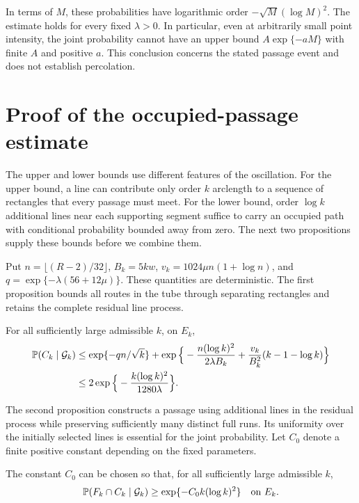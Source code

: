 \documentclass[11pt,letterpaper]{article}
\begin{document}
In terms of $M$, these probabilities have logarithmic order $-\sqrt M(\log M)^2$. The estimate holds for every fixed $\lambda>0$. In particular, even at arbitrarily small point intensity, the joint probability cannot have an upper bound $A\exp\{-aM\}$ with finite $A$ and positive $a$. This conclusion concerns the stated passage event and does not establish percolation.

\section{Proof of the occupied-passage estimate}

The upper and lower bounds use different features of the oscillation. For the upper bound, a line can contribute only order $k$ arclength to a sequence of rectangles that every passage must meet. For the lower bound, order $\log k$ additional lines near each supporting segment suffice to carry an occupied path with conditional probability bounded away from zero. The next two propositions supply these bounds before we combine them.

Put $n=\lfloor(R-2)/32\rfloor$, $B_k=5kw$, $v_k=1024\mu n(1+\log n)$, and $q=\exp\{-\lambda(56+12\mu)\}$. These quantities are deterministic. The first proposition bounds all routes in the tube through separating rectangles and retains the complete residual line process.

\begin{proposition}\label{prop:upper}
For all sufficiently large admissible $k$, on $E_k$,
\begin{equation}\label{eq:upper-explicit}
\begin{aligned}
 \P(C_k\mid\mathcal G_k)
 &\le \exp\{-qn/\sqrt k\}
 +\exp\Big\{-\frac{n(\log k)^2}{2\lambda B_k}
          +\frac{v_k}{B_k^2}(k-1-\log k)\Big\}\\
 &\le2\exp\Big\{-\frac{k(\log k)^2}{1280\lambda}\Big\}.
\end{aligned}
\end{equation}
\end{proposition}

The second proposition constructs a passage using additional lines in the residual process while preserving sufficiently many distinct full runs. Its uniformity over the initially selected lines is essential for the joint probability. Let $C_0$ denote a finite positive constant depending on the fixed parameters.

\begin{proposition}\label{prop:lower}
The constant $C_0$ can be chosen so that, for all sufficiently large admissible $k$,
\begin{equation}\label{eq:lower}
 \P(F_k\cap C_k\mid\mathcal G_k)\ge\exp\{-C_0k(\log k)^2\}
 \quad\text{on }E_k.
\end{equation}
\end{proposition}
\end{document}
